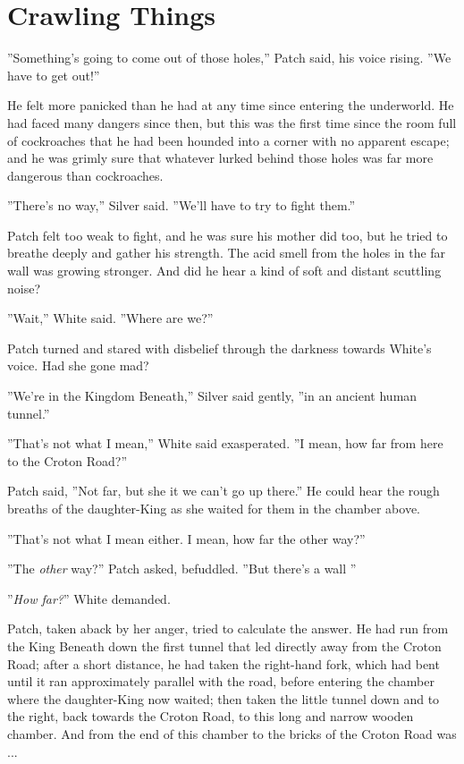 \documentclass[12pt]{book}
\begin{document}
\section{Crawling Things}

 ''Something's going to come out of those holes,'' Patch said, his voice rising. ''We have to get out!''\par
 He felt more panicked than he had at any time since entering the underworld. He had faced many dangers since then, but this was the first time since the room full of cockroaches that he had been hounded into a corner with no apparent escape; and he was grimly sure that whatever lurked behind those holes was far more dangerous than cockroaches.\par
 ''There's no way,'' Silver said. ''We'll have to try to fight them.''\par
 Patch felt too weak to fight, and he was sure his mother did too, but he tried to breathe deeply and gather his strength. The acid smell from the holes in the far wall was growing stronger. And did he hear a kind of soft and distant scuttling noise?\par
 ''Wait,'' White said. ''Where are we?''\par
 Patch turned and stared with disbelief through the darkness towards White's voice. Had she gone mad?\par
 ''We're in the Kingdom Beneath,'' Silver said gently, ''in an ancient human tunnel.''\par
 ''That's not what I mean,'' White said exasperated. ''I mean, how far from here to the Croton Road?''\par
 Patch said, ''Not far, but she %
 it %
 we can't go up there.'' He could hear the rough breaths of the daughter-King as she waited for them in the chamber above.\par
 ''That's not what I mean either. I mean, how far the other way?''\par
 ''The {\it other} way?'' Patch asked, befuddled. ''But there's a wall %
''\par
 ''{\it How far?}'' White demanded.\par
 Patch, taken aback by her anger, tried to calculate the answer. He had run from the King Beneath down the first tunnel that led directly away from the Croton Road; after a short distance, he had taken the right-hand fork, which had bent until it ran approximately parallel with the road, before entering the chamber where the daughter-King now waited; then taken the little tunnel down and to the right, back towards the Croton Road, to this long and narrow wooden chamber. And from the end of this chamber to the bricks of the Croton Road was ...\par
\end{document}
